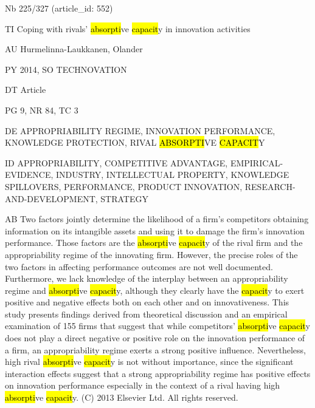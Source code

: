 \documentclass[a4paper]{article}
\begin{document}
\vspace*{-2cm}
Nb \tabto{0cm}225/327 (article\_id: 552)\par
TI \tabto{0cm}Coping with rivals' \hl{absorpti}ve \hl{capacit}y in innovation activities\par
AU \tabto{0cm}Hurmelinna-Laukkanen, Olander\par
PY \tabto{0cm}2014, SO TECHNOVATION\par
DT \tabto{0cm}Article\par
PG \tabto{0cm}9, NR 84, TC 3\par
DE \tabto{0cm}APPROPRIABILITY REGIME, INNOVATION PERFORMANCE, KNOWLEDGE PROTECTION, RIVAL \hl{ABSORPTI}VE \hl{CAPACIT}Y\par
ID \tabto{0cm}APPROPRIABILITY, COMPETITIVE ADVANTAGE, EMPIRICAL-EVIDENCE, INDUSTRY, INTELLECTUAL PROPERTY, KNOWLEDGE SPILLOVERS, PERFORMANCE, PRODUCT INNOVATION, RESEARCH-AND-DEVELOPMENT, STRATEGY\par
AB \tabto{0cm}Two factors jointly determine the likelihood of a firm's competitors obtaining information on its intangible assets and using it to damage the firm's innovation performance. Those factors are the \hl{absorpti}ve \hl{capacit}y of the rival firm and the appropriability regime of the innovating firm. However, the precise roles of the two factors in affecting performance outcomes are not well documented. Furthermore, we lack knowledge of the interplay between an appropriability regime and \hl{absorpti}ve \hl{capacit}y, although they clearly have the \hl{capacit}y to exert positive and negative effects both on each other and on innovativeness. This study presents findings derived from theoretical discussion and an empirical examination of 155 firms that suggest that while competitors' \hl{absorpti}ve \hl{capacit}y does not play a direct negative or positive role on the innovation performance of a firm, an appropriability regime exerts a strong positive influence. Nevertheless, high rival \hl{absorpti}ve \hl{capacit}y is not without importance, since the significant interaction effects suggest that a strong appropriability regime has positive effects on innovation performance especially in the context of a rival having high \hl{absorpti}ve \hl{capacit}y. (C) 2013 Elsevier Ltd. All rights reserved.\par
\clearpage
\end{document}
